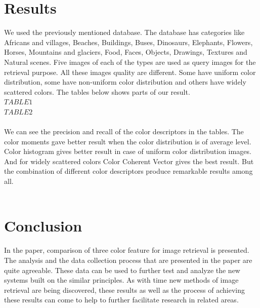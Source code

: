 \documentclass{report}
\begin{document}
\section{Results}
We used the previously mentioned database. The database has categories like  Africans and villages, Beaches, Buildings, Buses, Dinosaurs, Elephants, Flowers, Horses, Mountains and glaciers, Food, Faces, Objects, Drawings, Textures and Natural scenes. Five images of each of the types are used as query images for the retrieval purpose. All these images quality are different. Some have uniform color distribution, some have non-uniform color distribution and others have widely scattered colors. The tables below shows parts of our result.\\
$TABLE1$\\
$TABLE2$\\
\\
We can see the precision and recall of the color descriptors in the tables. The color moments gave better result when the color distribution is of average level. Color histogram gives better result in case of uniform color distribution images. And for widely scattered colors Color Coherent Vector gives the best result. But the combination of different color descriptors produce remarkable results among all.\\
\\
\section{Conclusion}
In the paper, comparison of three color feature for image retrieval is presented. The analysis and the data collection process that are presented in the paper are quite agreeable. These data can be used to further test and analyze the new systems built on the similar principles. As with time new methods of image retrieval are being discovered, these results as well as the process of achieving these results can come to help to further facilitate research in related areas.
\end{document}
